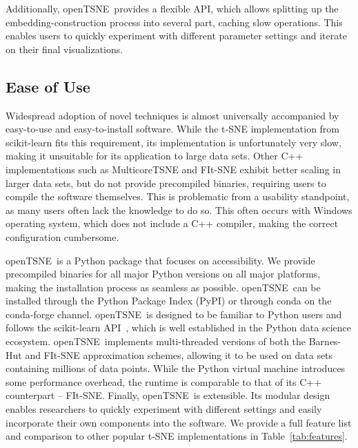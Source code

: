 \documentclass[twocolumn]{bmcart}
\newcommand{\opentsne}{\textsf{openTSNE}}
\begin{document}
Additionally, \opentsne\ provides a flexible API, which allows splitting up the
embedding-construction process into several part, caching slow operations. This
enables users to quickly experiment with different parameter settings and
iterate on their final visualizations.

\subsection*{Ease of Use}

Widespread adoption of novel techniques is almost universally accompanied by
easy-to-use and easy-to-install software. While the t-SNE implementation from
\textsf{scikit-learn} fits this requirement, its implementation is
unfortunately very slow, making it unsuitable for its application to large data
sets. Other C++ implementations such as \textsf{MulticoreTSNE} and
\textsf{FIt-SNE} exhibit better scaling in larger data sets, but do not provide
precompiled binaries, requiring users to compile the software themselves. This
is problematic from a usability standpoint, as many users often lack the
knowledge to do so. This often occurs with Windows operating system, which does
not include a C++ compiler, making the correct configuration cumbersome.

\opentsne\ is a Python package that focuses on accessibility. We provide
precompiled binaries for all major Python versions on all major platforms,
making the installation process as seamless as possible. \opentsne\ can be
installed through the Python Package Index (PyPI) or through conda on the
conda-forge channel. \opentsne\ is designed to be familiar to Python users and
follows the \textsf{scikit-learn} API~\cite{sklearn_api}, which is well
established in the Python data science ecosystem. \opentsne\ implements
multi-threaded versions of both the Barnes-Hut and FIt-SNE approximation
schemes, allowing it to be used on data sets containing millions of data
points. While the Python virtual machine introduces some performance overhead,
the runtime is comparable to that of its C++ counterpart --
\textsf{FIt-SNE}. Finally, \opentsne\ is extensible. Its modular design enables
researchers to quickly experiment with different settings and easily
incorporate their own components into the software. We provide a full feature
list and comparison to other popular t-SNE implementations in
Table~\ref{tab:features}.
\end{document}
